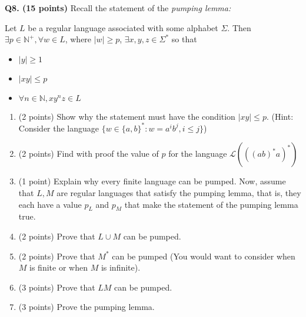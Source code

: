 \documentclass{article}
\begin{document}
    \pagebreak

    \textbf{Q8. (15 points)} Recall the statement of the \textit{pumping lemma:}

    \smallskip

    \noindent Let \(L\) be a regular language associated with some alphabet \(\Sigma\). Then \(\exists p \in \mathbb{N} ^+, \forall w \in L\), where \(|w| \geq p\), \(\exists x,y,z \in \Sigma ^*\) so that
    \begin{itemize}
        \item \(|y| \geq 1\)
        \item \(|xy| \leq p\)
        \item \(\forall n \in \mathbb{N}, xy^nz \in L\) 
    \end{itemize}

    \begin{enumerate}[label=\alph*)]
        \item (2 points) Show why the statement must have the condition \(|xy| \leq p\). (Hint: Consider the language \(\{w \in \{a, b\}^* : w = a^i b^j , i \leq j\}\))
        \vfill
        \item (2 points) Find with proof the value of \(p\) for the language \(\mathcal{L}(((ab)^*a)^*)\) 
        \vfill
        \item (1 point) Explain why every finite language can be pumped.
        \vfill
        \pagebreak
        Now, assume that \(L,M\) are regular languages that satisfy the pumping lemma, that is, they each have a value \(p_L\) and \(p_M\) that make the statement of the pumping lemma true.
        \item (2 points) Prove that \(L \cup M\) can be pumped.
        \vfill
        \item (2 points) Prove that \(M^*\) can be pumped (You would want to consider when \(M\) is finite or when \(M\) is infinite).
        \vfill
        \pagebreak
        \item (3 points) Prove that \(LM\) can be pumped.
        \vfill
        \item (3 points) Prove the pumping lemma.
        \vfill
    \end{enumerate}
\end{document}
